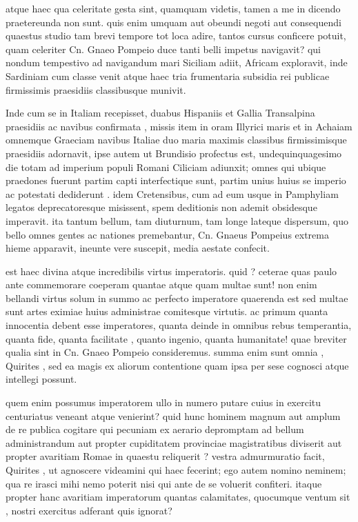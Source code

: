  atque haec qua celeritate gesta sint, quamquam videtis, tamen a me in dicendo praetereunda non sunt. quis enim umquam aut obeundi negoti aut consequendi quaestus studio tam brevi tempore tot loca adire, tantos cursus conficere potuit, quam celeriter Cn. Gnaeo Pompeio duce tanti belli impetus navigavit? qui nondum tempestivo ad navigandum mari Siciliam adiit, Africam exploravit, inde Sardiniam cum classe venit atque haec tria frumentaria subsidia rei publicae firmissimis praesidiis classibusque munivit.

 Inde cum se in Italiam recepisset, duabus Hispaniis et Gallia Transalpina praesidiis ac navibus confirmata , missis item in oram Illyrici maris et in Achaiam omnemque Graeciam navibus Italiae duo maria maximis classibus firmissimisque praesidiis adornavit, ipse autem ut Brundisio profectus est, undequinquagesimo die totam ad imperium populi Romani Ciliciam adiunxit; omnes qui ubique praedones fuerunt partim capti interfectique sunt, partim unius huius se imperio ac potestati dediderunt . idem Cretensibus, cum ad eum usque in Pamphyliam legatos deprecatoresque misissent, spem deditionis non ademit obsidesque imperavit. ita tantum bellum, tam diuturnum, tam longe lateque dispersum, quo bello omnes gentes ac nationes premebantur, Cn. Gnaeus Pompeius extrema hieme apparavit, ineunte vere suscepit, media aestate confecit.

 est haec divina atque incredibilis virtus imperatoris. quid ? ceterae quas paulo ante commemorare coeperam quantae atque quam multae sunt! non enim bellandi virtus solum in summo ac perfecto imperatore quaerenda est sed multae sunt artes eximiae huius administrae comitesque virtutis. ac primum quanta innocentia debent esse imperatores, quanta deinde in omnibus rebus temperantia, quanta fide, quanta facilitate , quanto ingenio, quanta humanitate! quae breviter qualia sint in Cn. Gnaeo Pompeio consideremus. summa enim sunt omnia , Quirites , sed ea magis ex aliorum contentione quam ipsa per sese cognosci atque intellegi possunt.

 quem enim possumus imperatorem ullo in numero putare cuius in exercitu centuriatus veneant atque venierint? quid hunc hominem magnum aut amplum de re publica cogitare qui pecuniam ex aerario depromptam ad bellum administrandum aut propter cupiditatem provinciae magistratibus diviserit aut propter avaritiam Romae in quaestu reliquerit ? vestra admurmuratio facit, Quirites , ut agnoscere videamini qui haec fecerint; ego autem nomino neminem; qua re irasci mihi nemo poterit nisi qui ante de se voluerit confiteri. itaque propter hanc avaritiam imperatorum quantas calamitates, quocumque ventum sit , nostri exercitus adferant quis ignorat?

